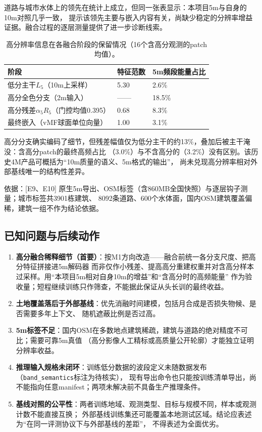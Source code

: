 \documentclass[UTF8,fontset=fandol,zihao=5,a4paper]{ctexart}
\newcommand{\source}[1]{\par{\footnotesize\color{muted}依据：#1}\par}
\begin{document}
道路与城市水体上的领先在统计上成立，但同一张表显示：本项目5m与自身的10m对照几乎一致，
提示该领先主要与嵌入内容有关，尚缺少稳定的分辨率增益证据。融合过程的逐层测量提供了进一步诊断线索。

\begin{table}[h]
\caption{高分辨率信息在各融合阶段的保留情况（16个含高分观测的patch均值）。}
\centering\small
\begin{tabularx}{\linewidth}{@{}p{4.4cm}YY@{}}
\toprule 阶段 & 特征范数 & 5m频段能量占比\\\midrule
低分主干$L_5$（10m上采样） & 5.30 & 2.6\%\\
高分全色分支（2m输入） & —— & 18.5\%\\
高分残差$\alpha_5R_5$（门控均值0.395） & 0.68 & 8.3\%\\
最终嵌入（vMF球面单位向量） & 1.00 & 3.1\%\\\bottomrule
\end{tabularx}
\end{table}

高分分支确实编码了细节，但残差幅值仅为低分主干的约13\%，叠加后被主干淹没：含高分patch的最终高频占比
（3.0\%）与不含高分的（3.2\%）没有区别。该历史4M产品可概括为“10m质量的语义、5m格式的输出”，
尚未兑现高分辨率相对外部基线唯一的结构性差异。

\source{[E9、E10] 原生5m导出、OSM标签（含860MB全国快照）与逐层钩子测量；城市标签共3901栋建筑、
8092条道路、600个水体面，国内OSM建筑覆盖偏稀，建筑一组不作为结论依据。}

\subsection{已知问题与后续动作}
\begin{enumerate}
\item \textbf{高分融合稀释细节（首要）}：按M1方向改造——融合前统一各分支尺度、把高分特征拼接进5m解码器
而非仅作小残差、提高高分重建权重并对含高分样本过采样。用“本项目5m相对自身10m的增益”和“含高分时的高频能量”
作为验收量；短程继续训练只作筛查，不能据此保证从头长训的最终收益。
\item \textbf{土地覆盖落后于外部基线}：优先消融时间建模，包括月合成是否损失物候、是否需要多年上下文、
随机遮蔽比例是否过高。
\item \textbf{5m标签不足}：国内OSM在多数地点建筑稀疏，建筑与道路的绝对精度不可比；需要可靠5m真值
（高分影像人工精标或高质量公开轮廓）才能独立证明分辨率收益。
\item \textbf{推理输入规格未闭环}：训练低分数据的波段定义未随数据发布（\texttt{band\_semantics}标注为待核实），
现有导出命令也只能按训练清单导出，尚不能指向任意manifest；两项未解决前不具备生产推理条件。
\item \textbf{基线对照的公平性}：两者训练地域、观测类型、目标与规模不同，样本或观测计数不能直接互换；
外部基线训练集还可能覆盖本地测试区域。结论应表述为“在同一评测协议下与外部基线的差距”，
不得表述为全面优劣。
\end{enumerate}
\end{document}
